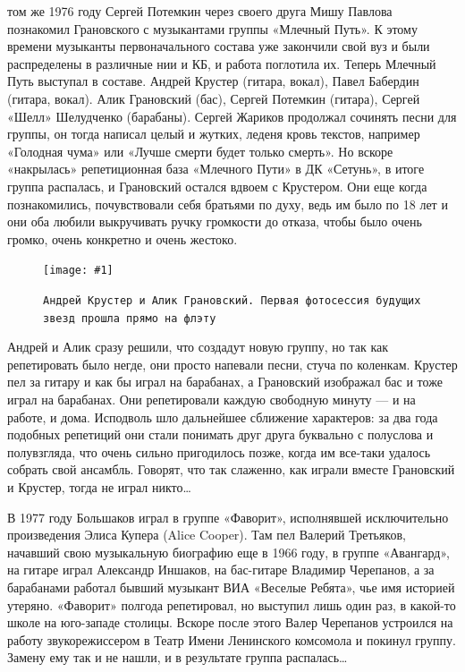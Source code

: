 \documentclass[16pt,a5paper]{book}
\newcommand{\myincludegraphics}[1]{\texttt{[image: \#1]}}
\begin{document}
 том же 1976 году Сергей Потемкин через своего друга Мишу Павлова познакомил Грановского с музыкантами группы
«Млечный Путь». К этому времени музыканты первоначального состава уже закончили свой вуз и были распределены в различные
нии и КБ, и работа поглотила их. Теперь Млечный Путь выступал в составе. Андрей Крустер (гитара, вокал), Павел Бабердин
(гитара, вокал). Алик Грановский (бас), Сергей Потемкин (гитара), Сергей «Шелл» Шелудченко (барабаны). Сергей Жариков
продолжал сочинять песни для группы, он тогда написал целый и жутких, леденя кровь текстов, например «Голодная чума» или
«Лучше смерти будет только смерть». Но вскоре «накрылась» репетиционная база «Млечного Пути» в ДК «Сетунь», в итоге
группа распалась, и Грановский остался вдвоем с Крустером. Они еще когда познакомились, почувствовали себя братьями по
духу, ведь им было по 18 лет и они оба любили выкручивать ручку громкости до отказа, чтобы было очень громко, очень
конкретно и очень жестоко.

\begin{figure}[h]
    \centering
    \myincludegraphics{Image05}
    \caption{\texttt{Андрей Крустер и Алик Грановский. Первая фотосессия будущих звезд прошла прямо на флэту}}
\end{figure}

Андрей и Алик сразу решили, что создадут новую группу, но так как репетировать было негде, они просто напевали песни,
стуча по коленкам. Крустер пел за гитару и как бы играл на барабанах, а Грановский изображал бас и тоже играл на
барабанах. Они репетировали каждую свободную минуту — и на работе, и дома. Исподволь шло дальнейшее сближение
характеров: за два года подобных репетиций они стали понимать друг друга буквально с полуслова и полувзгляда, что очень
сильно пригодилось позже, когда им все-таки удалось собрать свой ансамбль. Говорят, что так слаженно, как играли вместе
Грановский и Крустер, тогда не играл никто\ldots

В 1977 году Большаков играл в группе «Фаворит», исполнявшей исключительно произведения Элиса Купера (Alice Cooper). Там
пел Валерий Третьяков, начавший свою музыкальную биографию еще в 1966 году, в группе «Авангард», на гитаре играл
Александр Иншаков, на бас-гитаре Владимир Черепанов, а за барабанами работал бывший музыкант ВИА «Веселые Ребята», чье
имя историей утеряно. «Фаворит» полгода репетировал, но выступил лишь один раз, в какой-то школе на юго-западе столицы.
Вскоре после этого Валер Черепанов устроился на работу звукорежиссером в Театр Имени Ленинского комсомола и покинул
группу. Замену ему так и не нашли, и в результате группа распалась\ldots
\end{document}

